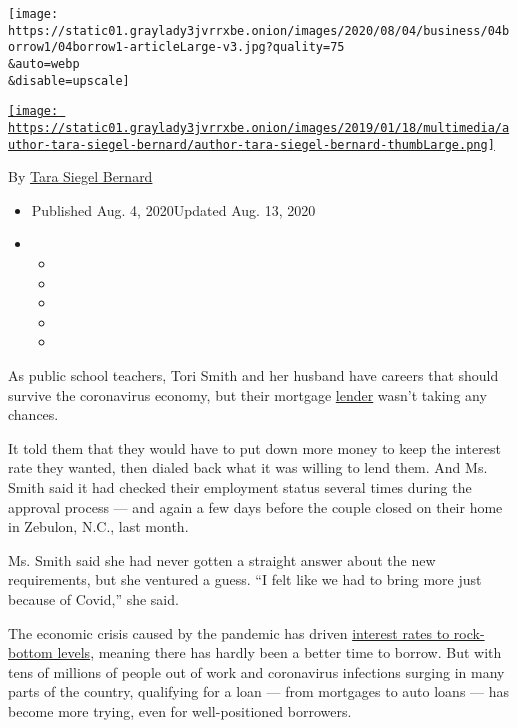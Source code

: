 \texttt{[image: https://static01.graylady3jvrrxbe.onion/images/2020/08/04/business/04borrow1/04borrow1-articleLarge-v3.jpg?quality=75\\\&auto=webp\\\&disable=upscale]}

\href{https://www.nytimes3xbfgragh.onion/by/tara-siegel-bernard}{\texttt{[image: https://static01.graylady3jvrrxbe.onion/images/2019/01/18/multimedia/author-tara-siegel-bernard/author-tara-siegel-bernard-thumbLarge.png]}}

By \href{https://www.nytimes3xbfgragh.onion/by/tara-siegel-bernard}{Tara
Siegel Bernard}

\begin{itemize}
\item
  Published Aug. 4, 2020Updated Aug. 13, 2020
\item
  \begin{itemize}
  \item
  \item
  \item
  \item
  \item
  \end{itemize}
\end{itemize}

As public school teachers, Tori Smith and her husband have careers that
should survive the coronavirus economy, but their mortgage
\href{https://www.nytimes3xbfgragh.onion/2020/08/13/business/commercial-landlord-loan-foreclosure.html}{lender}
wasn't taking any chances.

It told them that they would have to put down more money to keep the
interest rate they wanted, then dialed back what it was willing to lend
them. And Ms. Smith said it had checked their employment status several
times during the approval process --- and again a few days before the
couple closed on their home in Zebulon, N.C., last month.

Ms. Smith said she had never gotten a straight answer about the new
requirements, but she ventured a guess. ``I felt like we had to bring
more just because of Covid,'' she said.

The economic crisis caused by the pandemic has driven
\href{https://www.nytimes3xbfgragh.onion/2020/07/16/business/mortgage-rates-below-3-percent.html}{interest
rates to rock-bottom levels}, meaning there has hardly been a better
time to borrow. But with tens of millions of people out of work and
coronavirus infections surging in many parts of the country, qualifying
for a loan --- from mortgages to auto loans --- has become more trying,
even for well-positioned borrowers.

